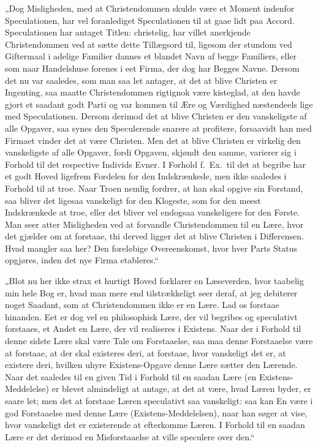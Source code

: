 „Dog Misligheden, med at Christendommen skulde være et Moment
indenfor Speculationen, har vel foranlediget Speculationen til at
gaae lidt paa Accord. Speculationen har antaget Titlen:
christelig, har villet anerkjende Christendommen ved at sætte
dette Tillægsord til, ligesom der stundom ved Giftermaal i adelige
Familier dannes et blandet Navn af begge Familiers, eller som naar
Handelshuse forenes i eet Firma, der dog har Begges Navne. Dersom
det nu var saaledes, som man saa let antager, at det at blive
Christen er Ingenting, saa maatte Christendommen rigtignok være
kisteglad, at den havde gjort et saadant godt Parti og var kommen
til Ære og Værdighed næstendeels lige med Speculationen. Dersom
derimod det at blive Christen er den
 vanskeligste af alle Opgaver, saa synes den Speculerende snarere
at profitere, forsaavidt han med Firmaet vinder det at være
Christen. Men det at blive Christen er virkelig den vanskeligste
af alle Opgaver, fordi Opgaven, skjøndt den samme, varierer sig i
Forhold til det respective Individs Evner. I Forhold f.\ Ex.\ til
det at begribe har et godt Hoved ligefrem Fordelen for den
Indskrænkede, men ikke saaledes i Forhold til at troe. Naar Troen
nemlig fordrer, at han skal opgive sin Forstand, saa bliver det
ligesaa vanskeligt for den Klogeste, som for den meest
Indskrænkede at troe, eller det bliver vel endogsaa vanskeligere
for den Første. Man seer atter Misligheden ved at forvandle
Christendommen til en Lære, hvor det gjælder om at forstaae, thi
derved ligger det at blive Christen i Differensen. Hvad mangler
saa her? Den foreløbige Overeenskomst, hvor hver Parts Status
opgjøres, inden det nye Firma etableres.“

„Blot nu her ikke strax et hurtigt Hoved forklarer en Læseverden,
hvor taabelig min hele Bog er, hvad man mere end tilstrækkeligt
seer deraf, at jeg debiterer noget Saadant, som at Christendommen
ikke er en Lære. Lad os forstaae hinanden. Eet er dog vel en
philosophisk Lære, der vil begribes og speculativt forstaaes, et
Andet en Lære, der vil realiseres i Existens. Naar der i Forhold
til denne sidste Lære skal være Tale om Forstaaelse, saa maa denne
Forstaaelse være at forstaae, at der skal existeres deri, at
forstaae, hvor vanskeligt det
 er, at existere deri, hvilken uhyre Existens-Opgave denne Lære
sætter den Lærende. Naar det saaledes til en given Tid i Forhold
til en saadan Lære (en Existens-Meddelelse) er blevet almindeligt
at antage, at det at være, hvad Læren byder, er saare let; men det
at forstaae Læren speculativt saa vanskeligt: saa kan En være i
god Forstaaelse med denne Lære (Existens-Meddelelsen), naar han
søger at vise, hvor vanskeligt det er existerende at efterkomme
Læren. I Forhold til en saadan Lære er det derimod en
Misforstaaelse at ville speculere over den.“

